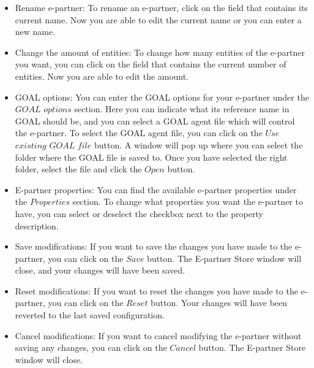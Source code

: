 \begin{itemize}
\item{Rename e-partner}:
To rename an e-partner, click on the field that contains its current name. Now you are able to edit the current name or you can enter a new name.

\item{Change the amount of entities}:
To change how many entities of the e-partner you want, you can click on the field that contains the current number of entities. Now you are able to edit the amount.

\item{GOAL options}:
You can enter the GOAL options for your e-partner under the $GOAL$ $options$ section. Here you can indicate what its reference name in GOAL should be, and you can select a GOAL agent file which will control the e-partner. To select the GOAL agent file, you can click on the $Use$ $existing$ $GOAL$ $file$ button. A window will pop up where you can select the folder where the GOAL file is saved to. Once you have selected the right folder, select the file and click the $Open$ button.

\item{E-partner properties}:
You can find the available e-partner properties under the $Properties$ section. To change what properties you want the e-partner to have, you can select or deselect the checkbox next to the property description.

\item{Save modifications}:
If you want to save the changes you have made to the e-partner, you can click on the $Save$ button. The E-partner Store window will close, and your changes will have been saved.

\item{Reset modifications}:
If you want to reset the changes you have made to the e-partner, you can click on the $Reset$ button. Your changes will have been reverted to the last saved configuration.

\item{Cancel modifications}:
If you want to cancel modifying the e-partner without saving any changes, you can click on the $Cancel$ button. The E-partner Store window will close.

\end{itemize}